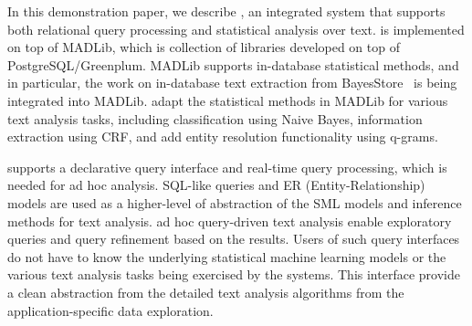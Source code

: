 
In this demonstration paper, we describe \system, an integrated
system that supports both relational query processing and
statistical analysis over text. \system is implemented on top of MADLib,
which is collection of libraries developed on 
top of PostgreSQL/Greenplum. MADLib supports
in-database statistical methods, and in particular, the work on in-database text extraction
 from BayesStore~\cite{Wang:2008:BML:1453856.1453896} is being integrated into
 MADLib. \system adapt the statistical methods in MADLib for various text analysis tasks, including classification using Naive Bayes, information extraction using CRF,
and add entity resolution functionality using q-grams.


\system supports a declarative query interface and real-time query
processing, which is needed for ad hoc analysis. SQL-like queries
and ER (Entity-Relationship) models are used as a higher-level of
abstraction of the SML models and inference methods for text
analysis. ad hoc query-driven text analysis enable exploratory
queries and query refinement based on the results. Users of such
query interfaces do not have to know the underlying statistical
machine learning models or the various text analysis tasks being
exercised by the systems. This interface provide a clean abstraction
from the detailed text analysis algorithms from the
application-specific data exploration.


